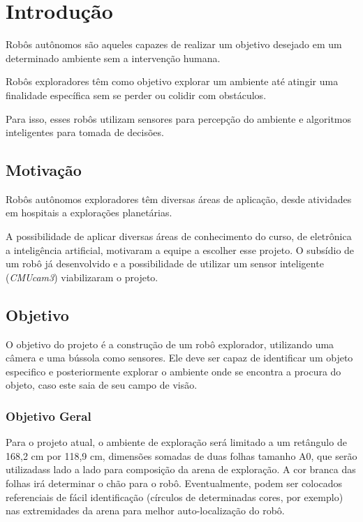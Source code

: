 \chapter{Introdução}

Robôs autônomos são aqueles capazes de realizar um objetivo desejado em um determinado ambiente sem a intervenção humana.

Robôs exploradores têm como objetivo explorar um ambiente até atingir uma finalidade específica sem se perder ou colidir com obstáculos.

Para isso, esses robôs utilizam sensores para percepção do ambiente e algoritmos inteligentes para tomada de decisões.

\section{Motivação}

Robôs autônomos exploradores têm diversas áreas de aplicação, desde atividades em hospitais a explorações planetárias. 

A possibilidade de aplicar diversas áreas de conhecimento do curso, de eletrônica a inteligência artificial, motivaram a equipe a escolher esse projeto. O subsídio de um robô já desenvolvido e a possibilidade de utilizar um sensor inteligente (\textit{CMUcam3}) viabilizaram o projeto.

\section{Objetivo}

O objetivo do projeto é a construção de um robô explorador, utilizando uma câmera e uma bússola como sensores. Ele deve ser capaz de identificar um objeto especifico e posteriormente explorar o ambiente onde se encontra a procura do objeto, caso este saia de seu campo de visão.

\subsection{Objetivo Geral}

Para o projeto atual, o ambiente de exploração será limitado a um retângulo de 168,2 cm por 118,9 cm, dimensões somadas de duas folhas tamanho A0, que serão utilizadass lado a lado para composição da arena de exploração. A cor branca das folhas irá determinar o chão para o robô. Eventualmente, podem ser colocados referenciais de fácil identificação (círculos de determinadas cores, por exemplo) nas extremidades da arena para melhor auto-localização do robô.


